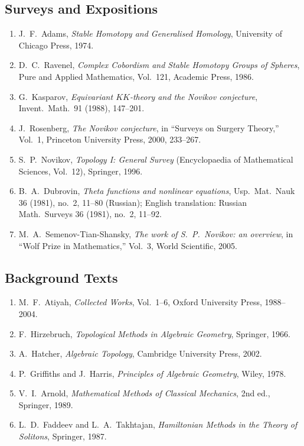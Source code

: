 \subsection*{Surveys and Expositions}
\begin{enumerate}
    \item J.\ F.\ Adams, \textit{Stable Homotopy and Generalised Homology}, University of Chicago Press, 1974.
    \item D.\ C.\ Ravenel, \textit{Complex Cobordism and Stable Homotopy Groups of Spheres}, Pure and Applied Mathematics, Vol.\ 121, Academic Press, 1986.
    \item G.\ Kasparov, \textit{Equivariant \(KK\)-theory and the Novikov conjecture}, Invent.\ Math.\ 91 (1988), 147--201.
    \item J.\ Rosenberg, \textit{The Novikov conjecture}, in ``Surveys on Surgery Theory,'' Vol.\ 1, Princeton University Press, 2000, 233--267.
    \item S.\ P.\ Novikov, \textit{Topology I: General Survey} (Encyclopaedia of Mathematical Sciences, Vol.\ 12), Springer, 1996.
    \item B.\ A.\ Dubrovin, \textit{Theta functions and nonlinear equations}, Usp.\ Mat.\ Nauk 36 (1981), no.\ 2, 11--80 (Russian); English translation: Russian Math.\ Surveys 36 (1981), no.\ 2, 11--92.
    \item M.\ A.\ Semenov-Tian-Shansky, \textit{The work of S.\ P.\ Novikov: an overview}, in ``Wolf Prize in Mathematics,'' Vol.\ 3, World Scientific, 2005.
\end{enumerate}

\subsection*{Background Texts}
\begin{enumerate}
    \item M.\ F.\ Atiyah, \textit{Collected Works}, Vol.\ 1--6, Oxford University Press, 1988--2004.
    \item F.\ Hirzebruch, \textit{Topological Methods in Algebraic Geometry}, Springer, 1966.
    \item A.\ Hatcher, \textit{Algebraic Topology}, Cambridge University Press, 2002.
    \item P.\ Griffiths and J.\ Harris, \textit{Principles of Algebraic Geometry}, Wiley, 1978.
    \item V.\ I.\ Arnold, \textit{Mathematical Methods of Classical Mechanics}, 2nd ed., Springer, 1989.
    \item L.\ D.\ Faddeev and L.\ A.\ Takhtajan, \textit{Hamiltonian Methods in the Theory of Solitons}, Springer, 1987.
\end{enumerate}

